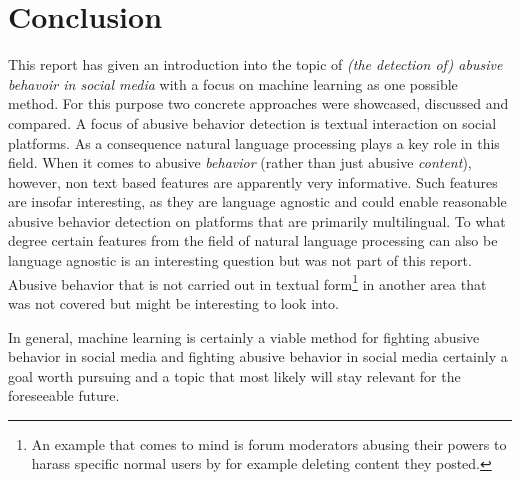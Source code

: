 \documentclass{proseminar}
\begin{document}
\section{Conclusion}
This report has given an introduction into the topic of \emph{(the detection of) abusive behavoir in social media} with a focus on machine learning as one possible method. For this purpose two concrete approaches were showcased, discussed and compared. A focus of abusive behavior detection is textual interaction on social platforms. As a consequence natural language processing plays a key role in this field. When it comes to abusive \emph{behavior} (rather than just abusive \emph{content}), however, non text based features are apparently very informative. Such features are insofar interesting, as they are language agnostic and could enable reasonable abusive behavior detection on platforms that are primarily multilingual. To what degree certain features from the field of natural language processing can also be language agnostic is an interesting question but was not part of this report. Abusive behavior that is not carried out in textual form\footnote{An example that comes to mind is forum moderators abusing their powers to harass specific normal users by for example deleting content they posted.} in another area that was not covered but might be interesting to look into.

In general, machine learning is certainly a viable method for fighting abusive behavior in social media and fighting abusive behavior in social media certainly a goal worth pursuing and a topic that most likely will stay relevant for the foreseeable future.\\
\end{document}
